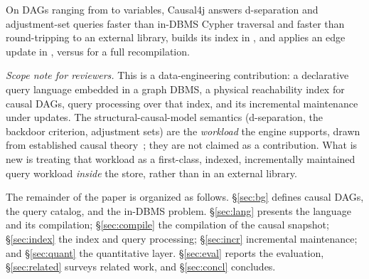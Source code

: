 On DAGs ranging from  to  variables, Causal4j
answers d-separation and adjustment-set queries  faster than
in-DBMS Cypher traversal and  faster than round-tripping to an
external library, builds its index in , and applies an edge
update in , versus  for a full recompilation.

\emph{Scope note for reviewers.} This is a data-engineering contribution: a
declarative query language embedded in a graph DBMS, a physical reachability index
for causal DAGs, query processing over that index, and its incremental
maintenance under updates. The structural-causal-model semantics (d-separation,
the backdoor criterion, adjustment sets) are the \emph{workload} the engine
supports, drawn from established causal theory~\cite{pearl2009causality}; they are
not claimed as a contribution. What is new is treating that workload as a
first-class, indexed, incrementally maintained query workload \emph{inside} the
store, rather than in an external library.

The remainder of the paper is organized as follows. \S\ref{sec:bg} defines
causal DAGs, the query catalog, and the in-DBMS problem. \S\ref{sec:lang}
presents the language and its compilation; \S\ref{sec:compile} the compilation
of the causal snapshot; \S\ref{sec:index} the index and query processing;
\S\ref{sec:incr} incremental maintenance; and \S\ref{sec:quant} the quantitative
layer. \S\ref{sec:eval} reports the evaluation, \S\ref{sec:related} surveys
related work, and \S\ref{sec:concl} concludes.
